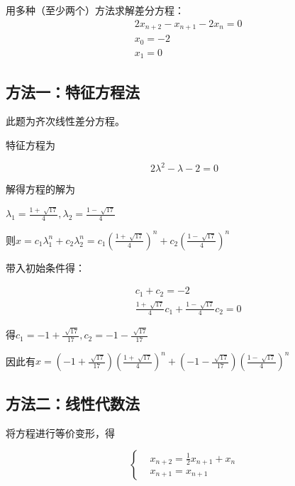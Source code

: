 \chapter{}

用多种（至少两个）方法求解差分方程：
\begin{equation*}
    \begin{split}
        &2x_{n+2} - x_{n+1} - 2x_n = 0\\
        &x_0 = -2\\
        &x_1 = 0
    \end{split}
\end{equation*}
\section{方法一：特征方程法}
此题为齐次线性差分方程。

特征方程为

\begin{equation}
    2\lambda^2-\lambda-2=0
\end{equation}

解得方程的解为

$\lambda_1 = \frac{1+\sqrt[]{17}}{4}, \lambda_2 = \frac{1-\sqrt[]{17}}{4} $

则$x=c_1\lambda_1^n + c_2\lambda_2^n = c_1(\frac{1+\sqrt[]{17}}{4})^n + c_2(\frac{1-\sqrt[]{17}}{4})^n$


带入初始条件得：

\begin{equation}
    \begin{aligned}
        &c_1+c_2=-2\\
        &\frac{1+\sqrt[]{17}}{4}c_1 + \frac{1-\sqrt[]{17}}{4}c_2 = 0
    \end{aligned}
\end{equation}

得$c_1=-1+\frac{\sqrt[]{17}}{17}, c_2=-1-\frac{\sqrt[]{17}}{17}$

因此有$x = (-1+\frac{\sqrt[]{17}}{17})(\frac{1+\sqrt[]{17}}{4})^n+(-1-\frac{\sqrt[]{17}}{17})( \frac{1-\sqrt[]{17}}{4} )^n$


\section{方法二：线性代数法}

将方程进行等价变形，得

\begin{equation}
    \left \{
        \begin{aligned}
        &x_{n+2} = \frac{1}{2}x_{n+1} + x_n\\
        &x_{n+1} = x_{n+1}
        \end{aligned}
    \right .
\end{equation}

